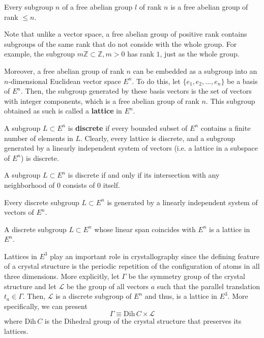   \begin{theorem}
    Every subgroup $n$ of a free abelian group $l$ of rank $n$ is a free abelian group of rank $ \leq n$. 
  \end{theorem}

  Note that unlike a vector space, a free abelian group of positive rank contains subgroups of the same rank that do not conside with the whole group. For example, the subgroup $m \mathbb{Z} \subset \mathbb{Z}, m > 0$ has rank $1$, just as the whole group. 

  Moreover, a free abelian group of rank $n$ can be embedded as a subgroup into an $n$-dimensional Euclidean vector space $E^n$. To do this, let $\{e_1, e_2, ..., e_n\}$ be a basis of $E^n$. Then, the subgroup generated by these basis vectors is the set of vectors with integer components, which is a free abelian group of rank $n$. This subgroup obtained as such is called a \textbf{lattice} in $E^n$. 

  \begin{definition}
    A subgroup $L \subset E^n$ is \textbf{discrete} if every bounded subset of $E^n$ contains a finite number of elements in $L$. Clearly, every lattice is discrete, and a subgroup generated by a linearly independent system of vectors (i.e. a lattice in a subspace of $E^n$) is discrete. 
  \end{definition}

  \begin{lemma}
    A subgroup $L \subset E^n$ is discrete if and only if its intersection with any neighborhood of $0$ consists of $0$ itself. 
  \end{lemma}

  \begin{theorem}
    Every discrete subgroup $L \subset E^n$ is generated by a linearly independent system of vectors of $E^n$. 
  \end{theorem}

  \begin{corollary}
    A discrete subgroup $L \subset E^n$ whose linear span coincides with $E^n$ is a lattice in $E^n$. 
  \end{corollary}

  Lattices in $E^3$ play an important role in crystallography since the defining feature of a crystal structure is the periodic repetition of the configuration of atoms in all three dimensions. More explicitly, let $\Gamma$ be the symmetry group of the crystal structure and let $\mathcal{L}$ be the group of all vectors $a$ such that the parallel translation $t_a \in \Gamma$. Then, $\mathcal{L}$ is a discrete subgroup of $E^n$ and thus, is a lattice in $E^3$. More specifically, we can present 
  \begin{equation}
    \Gamma \equiv \text{Dih}\,C \times \mathcal{L}
  \end{equation}
  where Dih$\, C$ is the Dihedral group of the crystal structure that preserves its lattices. 

